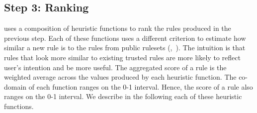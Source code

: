 \documentclass[conference]{IEEEtran}
\begin{document}







\subsection{Step 3: Ranking}
\label{sec:ranking}

\tname{} uses a composition of heuristic functions to rank the rules
produced in the previous step. Each of these functions uses a
different criterion to estimate how similar a new rule is to the rules
from public rulesets (\eg{},~\cite{emerging-threats-open}). The
intuition is that rules that look more similar to existing trusted
rules are more likely to reflect user's intention and be more
useful. The aggregated score of a rule is the weighted average across
the values produced by each heuristic function. The co-domain of each
function ranges on the 0-1 interval. Hence, the score of a rule also
ranges on the 0-1 interval. We describe in the following each of these
heuristic functions.
\end{document}
